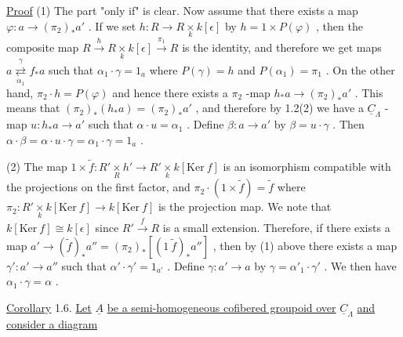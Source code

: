 \underline{Proof}  (1) The part  "only if"  is clear. Now assume that there exists a map $\varphi : a \longrightarrow (\pi_2)_* a'$  . If we set  $h : R \longrightarrow R \underset{k}{\times} k[\epsilon]$  by  $h = 1 \times P(\varphi)$  , then the composite map  $R \xrightarrow{\ h\ } R \underset{k}{\times} k[\epsilon] \xrightarrow{\ \pi_1\ } R$  is the identity, and therefore we get maps  $a \overset{\gamma}{\underset{\alpha_1}{\rightleftarrows}} f_* a$  such that  $\alpha_1 \cdot \gamma = 1_a$  where  $P(\gamma) = h$  and  $P(\alpha_1) = \pi_1$  . On the other hand,  $\pi_2 \cdot h = P(\varphi)$  and hence there exists a  $\pi_2$ -map $h_* a \longrightarrow (\pi_2)_* a'$  . This means that  $(\pi_2)_*(h_* a) = (\pi_2)_* a'$  , and therefore by 1.2(2) we have a  $\underline{C}_{\Lambda}$ -map  $u : h_* a \longrightarrow a'$  such that  $\alpha \cdot u = \alpha_1$  . Define $\beta : a \longrightarrow a'$  by  $\beta = u \cdot \gamma$  . Then  $\alpha \cdot \beta = \alpha \cdot u \cdot \gamma = \alpha_1 \cdot \gamma = 1_a$  .

(2) The map  $1 \times \tilde{f} : R' \underset{R}{\times} h' \longrightarrow R' \underset{k}{\times} k[\mathrm{Ker}\ f]$  is an isomorphism compatible with the projections on the first factor, and  $\pi_2 \cdot (1 \times \tilde{f}) = \tilde{f}$  where $\pi_2 : R' \underset{k}{\times} k[\mathrm{Ker}\ f] \longrightarrow k[\mathrm{Ker}\ f]$  is the projection map. We note that $k[\mathrm{Ker}\ f] \cong k[\epsilon]$  since  $R' \xrightarrow{\ f\ } R$  is a small extension. Therefore, if there exists a map  $a' \longrightarrow (\tilde{f})_* a'' = (\pi_2)_* [(1\ \tilde{f})_* a'']$  , then by (1) above there exists a map  $\gamma': a' \longrightarrow a''$  such that  $\alpha' \cdot \gamma' = 1_{a'}$  . Define  $\gamma : a' \longrightarrow a$ by  $\gamma = \alpha'_1 \cdot \gamma'$  . We then have  $\alpha_1 \cdot \gamma = \alpha$  .



\underline{Corollary} 1.6.   \underline{Let}  $\underline{A}$  \underline{be a semi-homogeneous cofibered groupoid over}  $\underline{C}_{\Lambda}$ \underline{and consider a diagram}

